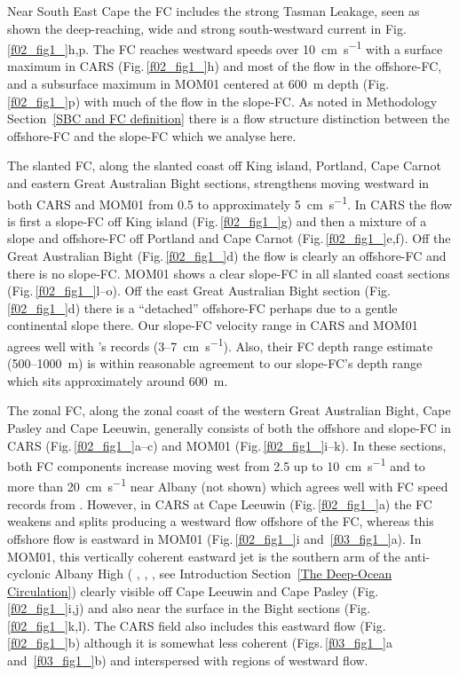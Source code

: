 \documentclass[preprint,3p,review,12pt]{elsarticle}
\newcommand{\citepos}[1]{\citeauthor{#1}'s \citeyearpar{#1}}
\begin{document}
Near South East Cape the FC includes the strong Tasman Leakage, seen as shown the deep-reaching, wide and strong south-westward current in Fig.\,\ref{f02_fig1_}h,p.
The FC reaches westward speeds over \SI{10}{\centi\meter\per\second} with a surface maximum in CARS (Fig.\,\ref{f02_fig1_}h) and most of the flow in the offshore-FC, and a subsurface maximum in MOM01 centered at \SI{600}{\meter} depth (Fig.\,\ref{f02_fig1_}p) with much of the flow in the slope-FC\@. As noted in Methodology Section~\ref{SBC and FC definition} there is a flow structure distinction between the offshore-FC and the slope-FC which we analyse here.

The slanted FC, along the slanted coast off King island, Portland, Cape Carnot and eastern Great Australian Bight sections, strengthens moving westward in both CARS and MOM01 from \num{0.5} to approximately \SI{5}{\centi\meter\per\second}. In CARS the flow is first a slope-FC off King island (Fig.\,\ref{f02_fig1_}g) and then a mixture of a slope and offshore-FC off Portland and Cape Carnot (Fig.\,\ref{f02_fig1_}e,f). Off the Great Australian Bight (Fig.\,\ref{f02_fig1_}d) the flow is clearly an offshore-FC and there is no slope-FC\@.
MOM01 shows a clear slope-FC in all slanted coast sections (Fig.\,\ref{f02_fig1_}l--o).
Off the east Great Australian Bight section (Fig.\,\ref{f02_fig1_}d) there is a ``detached'' offshore-FC perhaps due to a gentle continental slope there.
Our slope-FC velocity range in CARS and MOM01 agrees well with \citepos{Middleton2007} records (\num{3}--\SI{7}{\centi\meter\per\second}). Also, their FC depth range estimate (\num{500}--\SI{1000}{\meter}) is within reasonable agreement to our slope-FC's depth range which sits approximately around \SI{600}{\meter}.

The zonal FC, along the zonal coast of the western Great Australian Bight, Cape Pasley and Cape Leeuwin, generally consists of both the offshore and slope-FC in CARS (Fig.\,\ref{f02_fig1_}a--c) and MOM01 (Fig.\,\ref{f02_fig1_}i--k). In these sections, both FC components increase moving west from \num{2.5} up to \SI{10}{\centi\meter\per\second} and to more than \SI{20}{\centi\meter\per\second} near Albany (not shown) which agrees well with FC speed records from \citet{Cresswell1993}. However, in CARS at Cape Leeuwin (Fig.\,\ref{f02_fig1_}a) the FC weakens and splits producing a westward flow offshore of the FC, whereas this offshore flow is eastward in MOM01 (Fig.\,\ref{f02_fig1_}i and~\ref{f03_fig1_}a).
In MOM01, this vertically coherent eastward jet is the southern arm of the anti-cyclonic Albany High (\citeauthor{Middleton2003} \citeyear{Middleton2003}, \citeauthor{Middleton2007} \citeyear{Middleton2007}, \citeauthor{McCartney2007} \citeyear{McCartney2007}, see Introduction Section~\ref{The Deep-Ocean Circulation}) clearly visible off Cape Leeuwin and Cape Pasley (Fig.\,\ref{f02_fig1_}i,j) and also near the surface in the Bight sections (Fig.\,\ref{f02_fig1_}k,l).
The CARS field also includes this eastward flow (Fig.\,\ref{f02_fig1_}b) although it is somewhat less coherent (Figs.\,\ref{f03_fig1_}a and~\ref{f03_fig1_}b) and interspersed with regions of westward flow.
\end{document}
